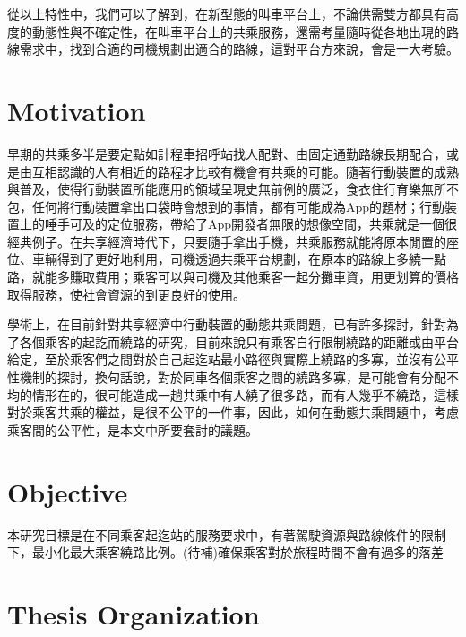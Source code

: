 從以上特性中，我們可以了解到，在新型態的叫車平台上，不論供需雙方都具有高度的動態性與不確定性，在叫車平台上的共乘服務，還需考量隨時從各地出現的路線需求中，找到合適的司機規劃出適合的路線，這對平台方來說，會是一大考驗。

\section{Motivation}

早期的共乘多半是要定點如計程車招呼站找人配對、由固定通勤路線長期配合，或是由互相認識的人有相近的路程\cite{chan_ridesharing_2012}才比較有機會有共乘的可能。隨著行動裝置的成熟與普及，使得行動裝置所能應用的領域呈現史無前例的廣泛，食衣住行育樂無所不包，任何將行動裝置拿出口袋時會想到的事情，都有可能成為App的題材；行動裝置上的唾手可及的定位服務，帶給了App開發者無限的想像空間，共乘就是一個很經典例子。在共享經濟時代下，只要隨手拿出手機，共乘服務就能將原本閒置的座位、車輛得到了更好地利用，司機透過共乘平台規劃，在原本的路線上多繞一點路，就能多賺取費用；乘客可以與司機及其他乘客一起分攤車資，用更划算的價格取得服務，使社會資源的到更良好的使用。

學術上，在目前針對共享經濟中行動裝置的動態共乘問題，已有許多探討，針對為了各個乘客的起訖而繞路的研究，目前來說只有乘客自行限制繞路的距離或由平台給定\cite{shen_dynamic_2016}，至於乘客們之間對於自己起迄站最小路徑與實際上繞路的多寡，並沒有公平性機制的探討，換句話說，對於同車各個乘客之間的繞路多寡，是可能會有分配不均的情形在的，很可能造成一趟共乘中有人繞了很多路，而有人幾乎不繞路，這樣對於乘客共乘的權益，是很不公平的一件事，因此，如何在動態共乘問題中，考慮乘客間的公平性，是本文中所要套討的議題。

\section{Objective}

本研究目標是在不同乘客起迄站的服務要求中，有著駕駛資源與路線條件的限制下，最小化最大乘客繞路比例。(待補)確保乘客對於旅程時間不會有過多的落差

\section{Thesis Organization}

